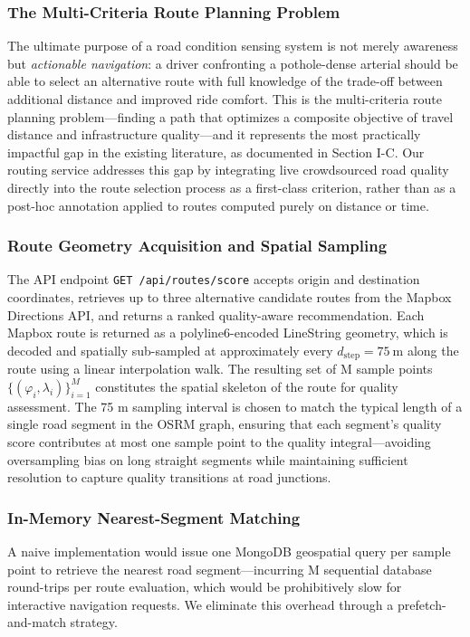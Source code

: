 \documentclass[conference]{IEEEtran}
\begin{document}
\subsubsection{The Multi-Criteria Route Planning Problem}
The ultimate purpose of a road condition sensing system is not merely awareness but \textit{actionable navigation}: a driver confronting a pothole-dense arterial should be able to select an alternative route with full knowledge of the trade-off between additional distance and improved ride comfort. This is the multi-criteria route planning problem---finding a path that optimizes a 
composite objective of travel distance and infrastructure quality---and it represents the most practically impactful gap in the existing literature, as documented in Section I-C.
Our routing service addresses this gap by integrating live crowdsourced road quality directly into the route selection process as a first-class criterion, rather than as a post-hoc annotation applied to routes computed purely on distance or time.

\subsubsection{Route Geometry Acquisition and Spatial Sampling}
The API endpoint \texttt{GET /api/routes/score} accepts origin and destination coordinates, retrieves up to three alternative candidate routes from the Mapbox Directions API, and returns a ranked quality-aware recommendation.
Each Mapbox route is returned as a polyline6-encoded LineString geometry, which is decoded and spatially sub-sampled at approximately every $d_{\text{step}} = 75~\text{m}$ along the route using a linear interpolation walk.
The resulting set of M sample points $\{(\varphi_i, \lambda_i)\}_{i=1}^{M}$ constitutes the spatial skeleton of the route for quality assessment.
The 75 m sampling interval is chosen to match the typical length of a single road segment in the OSRM graph, ensuring that each segment's quality score contributes at most one sample point to the quality integral---avoiding oversampling bias on long straight segments while maintaining sufficient resolution to capture quality transitions at road junctions.

\subsubsection{In-Memory Nearest-Segment Matching}
A naive implementation would issue one MongoDB geospatial query per sample point to retrieve the nearest road segment---incurring M sequential database round-trips per route evaluation, which would be prohibitively slow for interactive navigation requests.
We eliminate this overhead through a prefetch-and-match strategy.
\end{document}
